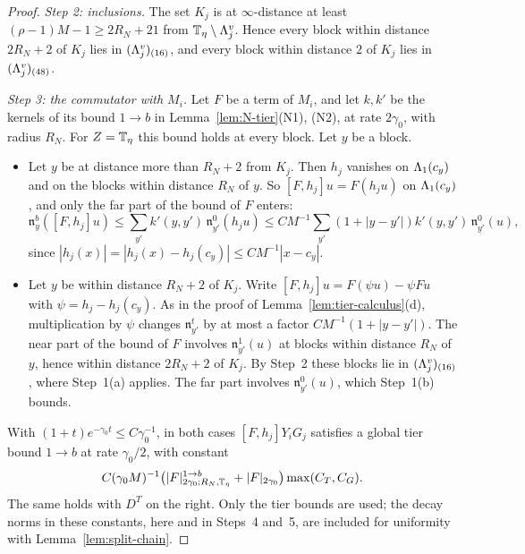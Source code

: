 \begin{proof}
\emph{Step 2: inclusions.} The set $K_j$ is at $\infty$-distance at least $(\rho-1)M-1\ge2R_N+21$ from $\mathbb T_\eta\setminus\Lambda^v_j$. Hence every block within distance $2R_N+2$ of $K_j$ lies in $(\Lambda^v_j)_{(16)}$, and every block within distance $2$ of $K_j$ lies in $(\Lambda^v_j)_{(48)}$.

\emph{Step 3: the commutator with $M_i$.} Let $F$ be a term of $M_i$, and let $k,k'$ be the kernels of its bound $1\to b$ in Lemma~\ref{lem:N-tier}(N1), (N2), at rate $2\gamma_0$, with radius $R_N$. For $Z=\mathbb T_\eta$ this bound holds at every block. Let $y$ be a block.
\begin{itemize}
\item Let $y$ be at distance more than $R_N+2$ from $K_j$. Then $h_j$ vanishes on $\Lambda_1(c_y)$ and on the blocks within distance $R_N$ of $y$. So $[F,h_j]u=F(h_ju)$ on $\Lambda_1(c_y)$, and only the far part of the bound of $F$ enters:
\[
\mathfrak n^b_y([F,h_j]u)\le\sum_{y'}k'(y,y')\,\mathfrak n^0_{y'}(h_ju)\le CM^{-1}\sum_{y'}(1+|y-y'|)k'(y,y')\,\mathfrak n^0_{y'}(u),
\]
since $|h_j(x)|=|h_j(x)-h_j(c_y)|\le CM^{-1}|x-c_y|$.
\item Let $y$ be within distance $R_N+2$ of $K_j$. Write $[F,h_j]u=F(\psi u)-\psi Fu$ with $\psi=h_j-h_j(c_y)$. As in the proof of Lemma~\ref{lem:tier-calculus}(d), multiplication by $\psi$ changes $\mathfrak n^t_{y'}$ by at most a factor $CM^{-1}(1+|y-y'|)$. The near part of the bound of $F$ involves $\mathfrak n^1_{y'}(u)$ at blocks within distance $R_N$ of $y$, hence within distance $2R_N+2$ of $K_j$. By Step~2 these blocks lie in $(\Lambda^v_j)_{(16)}$, where Step~1(a) applies. The far part involves $\mathfrak n^0_{y'}(u)$, which Step~1(b) bounds.
\end{itemize}
With $(1+t)e^{-\gamma_0t}\le C\gamma_0^{-1}$, in both cases $[F,h_j]Y_iG_j$ satisfies a global tier bound $1\to b$ at rate $\gamma_0/2$, with constant
\[
C(\gamma_0M)^{-1}\big(|F|^{1\to b}_{2\gamma_0;R_N,\mathbb T_\eta}+|F|_{2\gamma_0}\big)\max(C_T,C_G).
\]
The same holds with $D^T$ on the right. Only the tier bounds are used; the decay norms in these constants, here and in Steps~4 and~5, are included for uniformity with Lemma~\ref{lem:split-chain}.


\end{proof}
